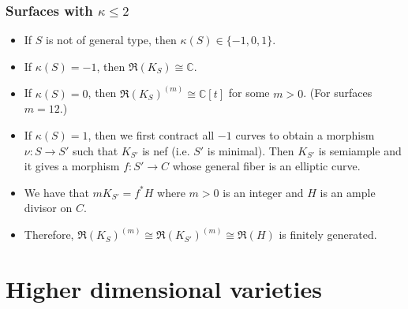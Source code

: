 \documentclass{beamer}
\theoremstyle{plain}
\theoremstyle{definition}
\theoremstyle{remark}
\begin{document}
\begin{frame}
 \frametitle{Surfaces with $\kappa \leq 2$}

\begin{itemize}
\item If $S$ is not of general type, then $\kappa (S)\in \{-1,0,1\}$.
\item If $\kappa (S)=-1$, then $\mathfrak{R}(K_S)\cong \mathbb{C}$.
\item If $\kappa (S)=0$, then $\mathfrak{R}(K_S)^{(m)}\cong \mathbb{C}[t]$
for some $m>0$. (For surfaces $m=12$.)
\item If $\kappa (S)=1$, then we first contract all $-1$ curves to obtain
a morphism $\nu :S\to S'$ such that $K_{S'}$ is nef (i.e. $S'$ is minimal).
Then $K_{S'}$ is semiample and it gives a morphism $f:S'\to C$
whose general fiber is an elliptic curve.
\item We have that $mK_{S'}=f^*H$ where $m>0$ is an integer and
$H$ is an ample divisor on $C$.
\item Therefore, $ \mathfrak{R}(K_S)^{(m)}\cong \mathfrak{R}(K_{S'})^{(m)}
\cong \mathfrak{R}( H)$ is finitely generated.
\end{itemize}
\end{frame}

\section{Higher dimensional varieties}
\end{document}
